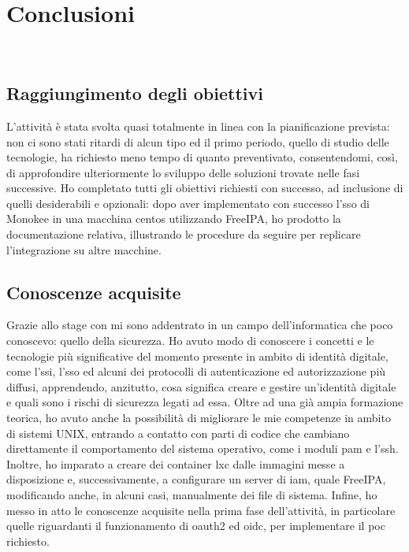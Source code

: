 
\chapter{Conclusioni}
\label{cap:conclusioni}

\\



\section{Raggiungimento degli obiettivi}

L'attività è stata svolta quasi totalmente in linea con la pianificazione prevista: non ci sono stati ritardi di alcun tipo ed il primo periodo, quello di studio delle tecnologie, ha richiesto meno tempo di quanto preventivato, consentendomi, così, di approfondire ulteriormente lo sviluppo delle soluzioni trovate nelle fasi successive.
Ho completato tutti gli obiettivi richiesti con successo, ad inclusione di quelli desiderabili e opzionali: dopo aver implementato con successo l'\acrshort{sso} di Monokee in una macchina \acrshort{centos} utilizzando FreeIPA, ho prodotto la documentazione relativa, illustrando le procedure da seguire per replicare l'integrazione su altre macchine.

\section{Conoscenze acquisite}

Grazie allo stage con \myAzienda{} mi sono addentrato in un campo dell'informatica che poco conoscevo: quello della sicurezza. Ho avuto modo di conoscere i concetti e le tecnologie più significative del momento presente in ambito di identità digitale, come l'\acrshort{ssi}, l'\acrshort{sso} ed alcuni dei protocolli di autenticazione ed autorizzazione più diffusi, apprendendo, anzitutto, cosa significa creare e gestire un'identità digitale e quali sono i rischi di sicurezza legati ad essa. Oltre ad una già ampia formazione teorica, ho avuto anche la possibilità di migliorare le mie competenze in ambito di sistemi UNIX, entrando a contatto con parti di codice che cambiano direttamente il comportamento del sistema operativo, come i moduli \acrshort{pam} e l'\acrshort{ssh}.
Inoltre, ho imparato a creare dei container \acrshort{lxc} dalle immagini messe a disposizione e, successivamente, a configurare un server di \acrshort{iam}, quale FreeIPA, modificando anche, in alcuni casi, manualmente dei file di sistema.
Infine, ho messo in atto le conoscenze acquisite nella prima fase dell'attività, in particolare quelle riguardanti il funzionamento di \acrshort{oauth2} ed \acrshort{oidc}, per implementare il \acrfull{poc} richiesto. 

